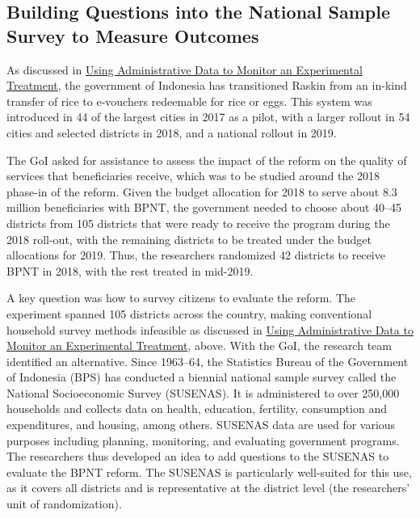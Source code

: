 \hypertarget{building-questions-into-the-national-sample-survey-to-measure-outcomes}{%
\subsection{Building Questions into the National Sample Survey to Measure Outcomes}\label{building-questions-into-the-national-sample-survey-to-measure-outcomes}}

As discussed in \protect\hyperlink{using-administrative-data-to-monitor-an-experimental-treatment}{Using Administrative Data to Monitor an Experimental Treatment}, the government of Indonesia has transitioned Raskin from an in-kind transfer of rice to e-vouchers redeemable for rice or eggs. This system was introduced in 44 of the largest cities in 2017 as a pilot, with a larger rollout in 54 cities and selected districts in 2018, and a national rollout in 2019.

The GoI asked for assistance to assess the impact of the reform on the quality of services that beneficiaries receive, which was to be studied around the 2018 phase-in of the reform. Given the budget allocation for 2018 to serve about 8.3 million beneficiaries with BPNT, the government needed to choose about 40--45 districts from 105 districts that were ready to receive the program during the 2018 roll-out, with the remaining districts to be treated under the budget allocations for 2019. Thus, the researchers randomized 42 districts to receive BPNT in 2018, with the rest treated in mid-2019.

A key question was how to survey citizens to evaluate the reform. The experiment spanned 105 districts across the country, making conventional household survey methods infeasible as discussed in \protect\hyperlink{using-administrative-data-to-monitor-an-experimental-treatment}{Using Administrative Data to Monitor an Experimental Treatment}, above. With the GoI, the research team identified an alternative. Since 1963--64, the Statistics Bureau of the Government of Indonesia (BPS) has conducted a biennial national sample survey called the National Socioeconomic Survey (SUSENAS). It is administered to over 250,000 households and collects data on health, education, fertility, consumption and expenditures, and housing, among others. SUSENAS data are used for various purposes including planning, monitoring, and evaluating government programs. The researchers thus developed an idea to add questions to the SUSENAS to evaluate the BPNT reform. The SUSENAS is particularly well-suited for this use, as it covers all districts and is representative at the district level (the researchers' unit of randomization).

